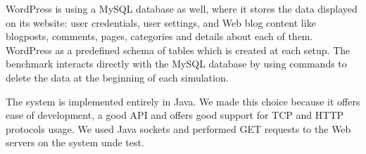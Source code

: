 WordPress is using a MySQL database as well, where it stores the data displayed on its website: user credentials, user settings, and Web blog content like blogposts, comments, pages, categories and details about each of them. WordPress as a predefined schema of tables which is created at each setup. The benchmark interacts directly with the MySQL database by using commands to delete the data at the beginning of each simulation.

The system is implemented entirely in Java. We made this choice because it offers ease of development, a good API and offers good support for TCP and HTTP protocols usage. We used Java sockets and performed GET requests to the Web servers on the system unde test.
